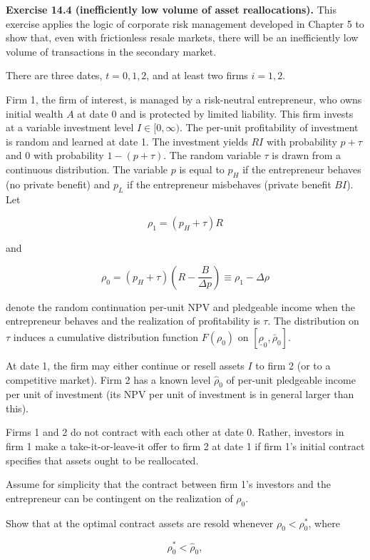 \documentclass[11pt,a4paper]{article}
\begin{document}
\textbf{Exercise 14.4 (inefficiently low volume of asset reallocations).} This exercise applies the
logic of corporate risk management developed in Chapter 5 to show that, even with frictionless
resale markets, there will be an inefficiently low volume of transactions in the secondary market.

There are three dates, \(t = 0, 1, 2\), and at least two firms \(i = 1, 2\).

Firm 1, the firm of interest, is managed by a risk-neutral entrepreneur, who owns initial wealth
\(A\) at date 0 and is protected by limited liability. This firm invests at a variable investment
level \(I \in [0, \infty)\). The per-unit profitability of investment is random and learned at date
1. The investment yields \(RI\) with probability \(p + \tau\) and 0 with probability
\(1 - (p + \tau)\). The random variable \(\tau\) is drawn from a continuous distribution. The
variable \(p\) is equal to \(p_H\) if the entrepreneur behaves (no private benefit) and \(p_L\) if
the entrepreneur misbehaves (private benefit \(BI\)). Let

\[\rho_1 = (p_H + \tau)R\]

and

\[\rho_0 = (p_H + \tau)\left(R - \frac{B}{\Delta p}\right) \equiv \rho_1 - \Delta\rho\]

denote the random continuation per-unit NPV and pledgeable income when the entrepreneur behaves and
the realization of profitability is \(\tau\). The distribution on \(\tau\) induces a cumulative
distribution function \(F(\rho_0)\) on \([\underline\rho_0, \bar\rho_0]\).

At date 1, the firm may either continue or resell assets \(I\) to firm 2 (or to a competitive
market). Firm 2 has a known level \(\hat\rho_0\) of per-unit pledgeable income per unit of
investment (its NPV per unit of investment is in general larger than this).

Firms 1 and 2 do not contract with each other at date 0. Rather, investors in firm 1 make a
take-it-or-leave-it offer to firm 2 at date 1 if firm 1's initial contract specifies that assets
ought to be reallocated.

Assume for simplicity that the contract between firm 1's investors and the entrepreneur can be
contingent on the realization of \(\rho_0\).

Show that at the optimal contract assets are resold whenever \(\rho_0 < \rho_0^*\), where

\[\rho_0^* < \hat\rho_0,\]
\end{document}
